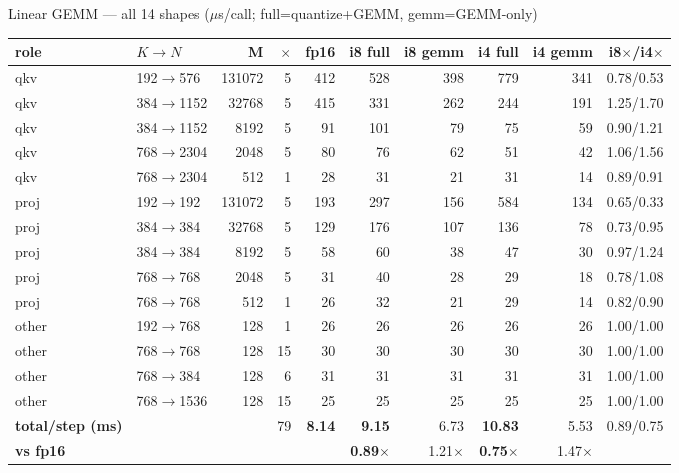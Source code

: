 \documentclass[aspectratio=169,10pt]{beamer}
\newcommand{\g}[1]{{\footnotesize\color{gray}#1}}
\begin{document}
\begin{frame}{Linear GEMM --- all 14 shapes \g{($\mu$s/call; full=quantize+GEMM, gemm=GEMM-only)}}
\centering\scriptsize\begin{tabular}{@{}llrrrrrrrr@{}}\toprule
role & $K\!\to\!N$ & M & $\times$ & fp16 & i8 full & i8 gemm & i4 full & i4 gemm & i8$\times$/i4$\times$\\\midrule
qkv & 192$\to$576 & 131072 & 5 & 412 & 528 & 398 & 779 & 341 & 0.78/0.53\\
qkv & 384$\to$1152 & 32768 & 5 & 415 & 331 & 262 & 244 & 191 & 1.25/1.70\\
qkv & 384$\to$1152 & 8192 & 5 & 91 & 101 & 79 & 75 & 59 & 0.90/1.21\\
qkv & 768$\to$2304 & 2048 & 5 & 80 & 76 & 62 & 51 & 42 & 1.06/1.56\\
qkv & 768$\to$2304 & 512 & 1 & 28 & 31 & 21 & 31 & 14 & 0.89/0.91\\
proj & 192$\to$192 & 131072 & 5 & 193 & 297 & 156 & 584 & 134 & 0.65/0.33\\
proj & 384$\to$384 & 32768 & 5 & 129 & 176 & 107 & 136 & 78 & 0.73/0.95\\
proj & 384$\to$384 & 8192 & 5 & 58 & 60 & 38 & 47 & 30 & 0.97/1.24\\
proj & 768$\to$768 & 2048 & 5 & 31 & 40 & 28 & 29 & 18 & 0.78/1.08\\
proj & 768$\to$768 & 512 & 1 & 26 & 32 & 21 & 29 & 14 & 0.82/0.90\\
other & 192$\to$768 & 128 & 1 & 26 & 26 & 26 & 26 & 26 & 1.00/1.00\\
other & 768$\to$768 & 128 & 15 & 30 & 30 & 30 & 30 & 30 & 1.00/1.00\\
other & 768$\to$384 & 128 & 6 & 31 & 31 & 31 & 31 & 31 & 1.00/1.00\\
other & 768$\to$1536 & 128 & 15 & 25 & 25 & 25 & 25 & 25 & 1.00/1.00\\
\midrule
\textbf{total/step (ms)} & & & 79 & \textbf{8.14} & \textbf{9.15} & 6.73 & \textbf{10.83} & 5.53 & 0.89/0.75\\
\textbf{vs fp16} & & & & & \textbf{0.89$\times$} & 1.21$\times$ & \textbf{0.75$\times$} & 1.47$\times$ & \\
\bottomrule\end{tabular}
\end{frame}
\end{document}

